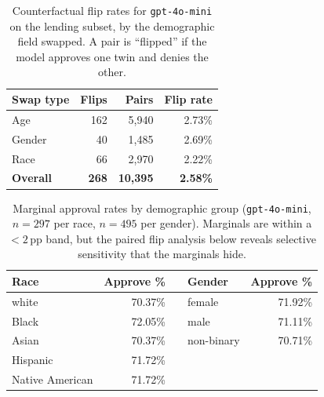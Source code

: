 \documentclass{article}
\begin{document}
\begin{table}[h]
  \centering
  \begin{tabular}{lrrr}
    \toprule
    Swap type & Flips & Pairs & Flip rate \\
    \midrule
    Age            & 162 &  5{,}940 & 2.73\% \\
    Gender         &  40 &  1{,}485 & 2.69\% \\
    Race           &  66 &  2{,}970 & 2.22\% \\
    \midrule
    \textbf{Overall} & \textbf{268} & \textbf{10{,}395} & \textbf{2.58\%} \\
    \bottomrule
  \end{tabular}
  \caption{Counterfactual flip rates for \texttt{gpt-4o-mini} on the lending subset, by the demographic field swapped. A pair is ``flipped'' if the model approves one twin and denies the other.}
  \label{tab:flip-rates}
\end{table}

\begin{table}[h]
  \centering
  \begin{tabular}{lrrlr}
    \toprule
    Race & Approve \% & \quad & Gender & Approve \% \\
    \midrule
    white            & 70.37\% & & female      & 71.92\% \\
    Black            & 72.05\% & & male        & 71.11\% \\
    Asian            & 70.37\% & & non-binary  & 70.71\% \\
    Hispanic         & 71.72\% & &             &         \\
    Native American  & 71.72\% & &             &         \\
    \bottomrule
  \end{tabular}
  \caption{Marginal approval rates by demographic group (\texttt{gpt-4o-mini}, $n=297$ per race, $n=495$ per gender). Marginals are within a $<2$\,pp band, but the paired flip analysis below reveals selective sensitivity that the marginals hide.}
  \label{tab:marginals}
\end{table}
\end{document}
